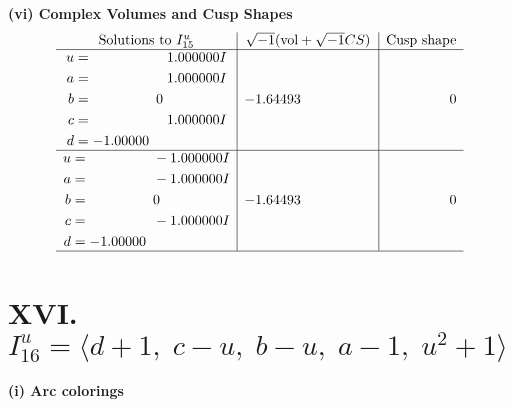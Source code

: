 \documentclass[1p]{elsarticle_modified}
\theoremstyle{definition}
\newcommand{\I}{\sqrt{-1}}
\begin{document}
\newpage\flushleft \textbf{(vi) Complex Volumes and Cusp Shapes}
$$\begin{array}{c|c|c}  
\text{Solutions to }I^u_{15}& \I (\text{vol} + \sqrt{-1}CS) & \text{Cusp shape}\\
 \hline 
\begin{aligned}
u &= \phantom{-0.000000 -}1.000000 I \\
a &= \phantom{-0.000000 -}1.000000 I \\
b &= \phantom{-0.000000 } 0 \\
c &= \phantom{-0.000000 -}1.000000 I \\
d &= -1.00000\phantom{ +0.000000I}\end{aligned}
 & -1.64493\phantom{ +0.000000I} & \phantom{-0.000000 } 0 \\ \hline\begin{aligned}
u &= \phantom{-0.000000 } -1.000000 I \\
a &= \phantom{-0.000000 } -1.000000 I \\
b &= \phantom{-0.000000 } 0 \\
c &= \phantom{-0.000000 } -1.000000 I \\
d &= -1.00000\phantom{ +0.000000I}\end{aligned}
 & -1.64493\phantom{ +0.000000I} & \phantom{-0.000000 } 0\\
 \hline 
 \end{array}$$\newpage\newpage\renewcommand{\arraystretch}{1}
\centering \section*{XVI. $I^u_{16}= \langle d+1,\;c- u,\;b- u,\;a-1,\;u^2+1 \rangle$}
\flushleft \textbf{(i) Arc colorings}\\
\end{document}
